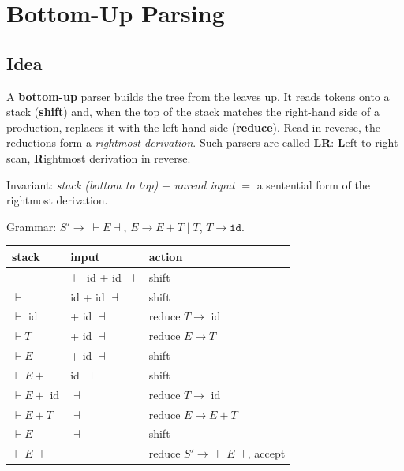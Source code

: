 \chapter{Bottom-Up Parsing}

\section{Idea}

A \textbf{bottom-up} parser builds the tree from the leaves up. It reads tokens onto a stack
(\textbf{shift}) and, when the top of the stack matches the right-hand side of a production,
replaces it with the left-hand side (\textbf{reduce}). Read in reverse, the reductions form a
\emph{rightmost derivation}. Such parsers are called \textbf{LR}: \textbf{L}eft-to-right scan,
\textbf{R}ightmost derivation in reverse.

Invariant: \emph{stack (bottom to top)} $+$ \emph{unread input} $=$ a sentential form of the
rightmost derivation.

\begin{example}
Grammar: $S'\to\ \vdash E\dashv$, $E\to E+T \mid T$, $T\to\mathtt{id}$.
\begin{center}
\small
\begin{tabular}{lll}
\toprule
stack & input & action \\
\midrule
 & $\vdash$ id + id $\dashv$ & shift \\
$\vdash$ & id + id $\dashv$ & shift \\
$\vdash$ id & + id $\dashv$ & reduce $T\to$ id \\
$\vdash T$ & + id $\dashv$ & reduce $E\to T$ \\
$\vdash E$ & + id $\dashv$ & shift \\
$\vdash E +$ & id $\dashv$ & shift \\
$\vdash E +$ id & $\dashv$ & reduce $T\to$ id \\
$\vdash E + T$ & $\dashv$ & reduce $E \to E+T$ \\
$\vdash E$ & $\dashv$ & shift \\
$\vdash E \dashv$ & & reduce $S' \to\ \vdash E\dashv$, accept \\
\bottomrule
\end{tabular}
\end{center}
\end{example}

